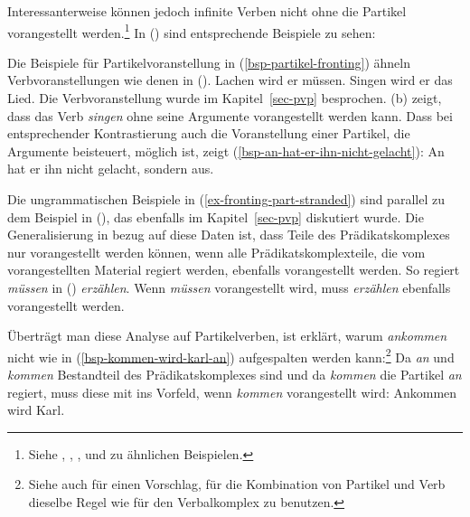 Interessanterweise können jedoch infinite Verben nicht ohne die Partikel vorangestellt werden.\footnote{
        Siehe , , , %
         und  zu ähnlichen Beispielen.
}
In () sind entsprechende Beispiele zu sehen:
\eal
\label{ex-fronting-part-stranded}
\zl

\noindent
Die Beispiele für Partikelvoranstellung in (\ref{bsp-partikel-fronting}) ähneln Verbvoranstellungen wie denen in ().
\eal
\ex Lachen wird er müssen.
\ex Singen wird er das Lied.
\zl
Die Verbvoranstellung wurde im Kapitel~\ref{sec-pvp} besprochen. (b) zeigt,
dass das Verb \emph{singen} ohne seine Argumente vorangestellt werden kann.
Dass bei entsprechender Kontrastierung auch die Voranstellung einer Partikel,
die Argumente beisteuert, möglich ist, zeigt (\ref{bsp-an-hat-er-ihn-nicht-gelacht}):
\ea
\label{bsp-an-hat-er-ihn-nicht-gelacht}
An hat er ihn nicht gelacht, sondern aus.
\z

\noindent
Die ungrammatischen Beispiele in (\ref{ex-fronting-part-stranded}) sind
parallel zu dem Beispiel in (), das ebenfalls im Kapitel~\ref{sec-pvp}
diskutiert wurde.
\label{ex-muessen-wird-er-ihr-zwei}
\z
Die Generalisierung in bezug auf diese Daten ist, dass Teile des Prädikatskomplexes
nur vorangestellt werden können, wenn alle Prädikatskomplexteile, die vom vorangestellten
Material regiert werden, ebenfalls vorangestellt werden.
So regiert \zb \emph{müssen} in () \emph{erzählen}.
Wenn \emph{müssen} vorangestellt wird, muss \emph{erzählen} ebenfalls vorangestellt werden.

Überträgt man diese Analyse auf Partikelverben, ist erklärt, warum \zb \emph{ankommen}
nicht wie in (\ref{bsp-kommen-wird-karl-an}) aufgespalten werden kann:\footnote{
  Siehe auch  für einen Vorschlag, für die
  Kombination von Partikel und Verb dieselbe Regel wie für den Verbalkomplex zu benutzen.%
}
Da \emph{an} und \emph{kommen}
Bestandteil des Prädikatskomplexes sind und da \emph{kommen} die Partikel \emph{an} regiert,
muss diese mit ins Vorfeld, wenn \emph{kommen} vorangestellt wird:
\ea
Ankommen wird Karl.
\z
{}



